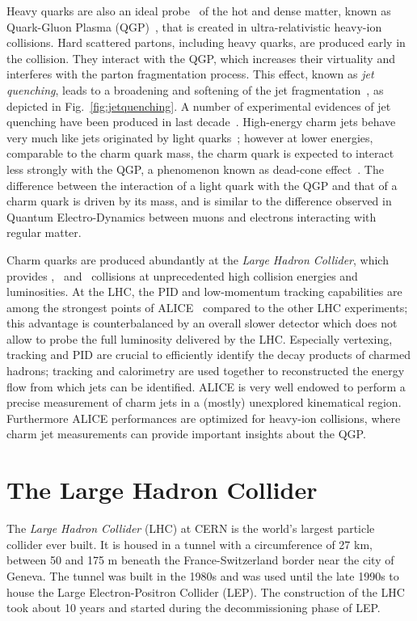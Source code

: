 \documentclass[12pt, a4paper, twoside, titlepage]{article}
\begin{document}
Heavy quarks are also an ideal probe~\cite{} of the hot and dense matter, known as Quark-Gluon Plasma (QGP)~\cite{}, that is created in ultra-relativistic heavy-ion collisions. 
Hard scattered partons, including heavy quarks, are produced early in the collision. They interact with the QGP, which increases their virtuality and interferes with the
parton fragmentation process. This effect, known as \emph{jet quenching}, leads to a broadening and softening of the jet fragmentation~\cite{}, as depicted in Fig.~\ref{fig:jetquenching}. A number of
experimental evidences of jet quenching have been produced in last decade~\cite{}.
High-energy charm jets behave very much like jets originated by light quarks~\cite{}; however at lower energies, comparable to the charm quark mass, the charm quark is expected
to interact less strongly with the QGP, a phenomenon known as dead-cone effect~\cite{}. The difference between the interaction of a light quark with the QGP and that of
a charm quark is driven by its mass, and is similar to the difference observed in Quantum Electro-Dynamics between muons and electrons interacting with regular matter.

Charm quarks are produced abundantly at the \emph{Large Hadron Collider}, which provides \pp, \pPb\ and \PbPb\ collisions at unprecedented high collision energies and luminosities.
At the LHC, the PID and low-momentum tracking capabilities are among the strongest points of ALICE~\cite{} compared to the other LHC experiments; 
this advantage is counterbalanced by an overall slower detector which does not allow to probe the full luminosity delivered by the LHC. 
Especially vertexing, tracking and PID are crucial to efficiently identify the decay products of charmed hadrons; tracking and calorimetry are used together to reconstructed the energy flow from which jets can be identified.
ALICE is very well endowed to perform a precise measurement of charm jets in a (mostly) unexplored kinematical region. Furthermore ALICE performances
are optimized for heavy-ion collisions, where charm jet measurements can provide important insights about the QGP.

\section{The Large Hadron Collider}
The \emph{Large Hadron Collider} (LHC) at CERN is the world's largest particle collider ever built.
It is housed in a tunnel with a circumference of 27 km, between 50 and 175 m beneath
the France-Switzerland border near the city of Geneva. The tunnel was built in the 1980s and was used until 
the late 1990s to house the Large Electron-Positron Collider (LEP). The construction of the LHC took about 10 years and started
during the decommissioning phase of LEP. 
\end{document}
